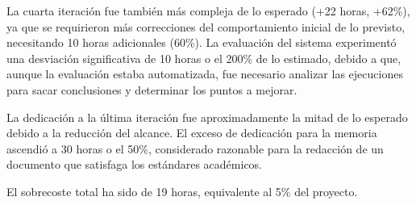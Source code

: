 La cuarta iteración fue también más compleja de lo esperado (+22 horas, +62\%), ya que se requirieron más correcciones del comportamiento inicial de lo previsto, necesitando 10 horas adicionales (60\%). La evaluación del sistema experimentó una desviación significativa de 10 horas o el 200\% de lo estimado, debido a que, aunque la evaluación estaba automatizada, fue necesario analizar las ejecuciones para sacar conclusiones y determinar los puntos a mejorar.

La dedicación a la última iteración fue aproximadamente la mitad de lo esperado debido a la reducción del alcance. El exceso de dedicación para la memoria ascendió a 30 horas o el 50\%, considerado razonable para la redacción de un documento que satisfaga los estándares académicos.

El sobrecoste total ha sido de 19 horas, equivalente al 5\% del proyecto.

